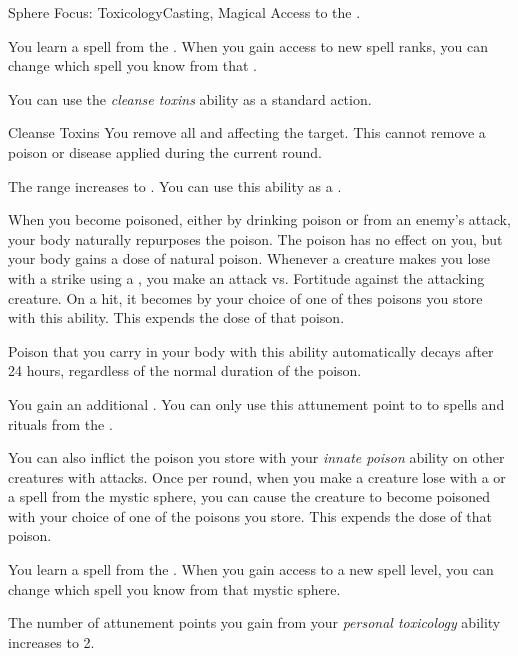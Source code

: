    \begin{feat}{Sphere Focus: Toxicology}{Casting, Magical}
        \featpre Access to the  .

         You learn a spell from the  .
        When you gain access to new spell ranks, you can change which spell you know from that .

         You can use the \textit{cleanse toxins} ability as a standard action.
        \begin{freeability}{Cleanse Toxins}
            \label{Cleanse Toxins}
            You remove all  and  affecting the target.
            This cannot remove a poison or disease applied during the current round.

            \rankline
             The range increases to \rngmed.
             You can use this ability as a .
        \end{freeability}

        When you become poisoned, either by drinking poison or from an enemy's attack, your body naturally repurposes the poison.
        The poison has no effect on you, but your body gains a dose of natural poison.
        Whenever a creature makes you lose  with a  strike using a , you make an attack vs. Fortitude against the attacking creature.
        On a hit, it becomes  by your choice of one of thes poisons you store with this ability.
        This expends the dose of that poison.

        Poison that you carry in your body with this ability automatically decays after 24 hours, regardless of the normal duration of the poison.

         You gain an additional .
        You can only use this attunement point to  to spells and rituals from the  .

        You can also inflict the poison you store with your \textit{innate poison} ability on other creatures with attacks.
        Once per round, when you make a creature lose  with a  or a spell from the  mystic sphere, you can cause the creature to become poisoned with your choice of one of the poisons you store.
        This expends the dose of that poison.

         You learn a spell from the  .
        When you gain access to a new spell level, you can change which spell you know from that mystic sphere.

         The number of attunement points you gain from your \textit{personal toxicology} ability increases to 2.
    \end{feat}

